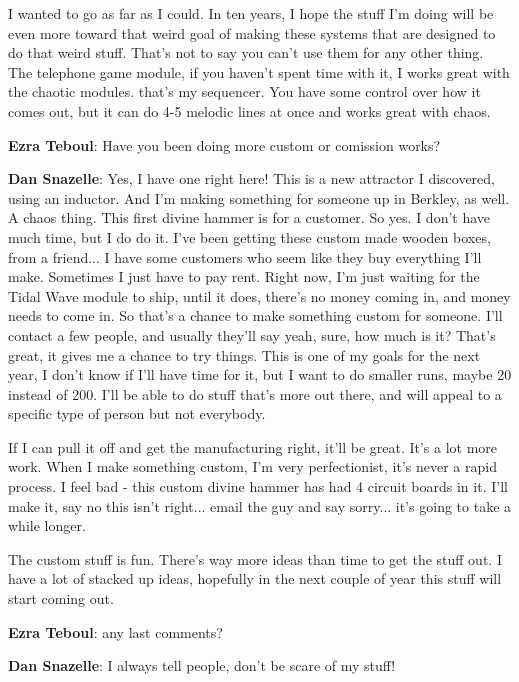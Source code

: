 I wanted to go as far as I could. In ten years, I hope the stuff I'm doing will be even more toward that weird goal of making these systems that are designed to do that weird stuff. That's not to say you can't use them for any other thing. The telephone game module, if you haven't spent time with it, I works great with the chaotic modules. that's my sequencer. You have some control over how it comes out, but it can do 4-5 melodic lines at once and works great with chaos. 

\textbf{Ezra Teboul}: Have you been doing more custom or comission works? 

\textbf{Dan Snazelle}: Yes, I have one right here! This is a new attractor I discovered, using an inductor. And I'm making something for someone up in Berkley, as well. A chaos thing. This first divine hammer is for a customer. So yes. I don't have much time, but I do do it. I've been getting these custom made wooden boxes, from a friend... I have some customers who seem like they buy everything I'll make. Sometimes I just have to pay rent. Right now, I'm just waiting for the Tidal Wave module to ship, until it does, there's no money coming in, and money needs to come in. So that's a chance to make something custom for someone. I'll contact a few people, and usually they'll say yeah, sure, how much is it? That's great, it gives me a chance to try things. This is one of my goals for the next year, I don't know if I'll have time for it, but I want to do smaller runs, maybe 20 instead of 200. I'll be able to do stuff that's more out there, and will appeal to a specific type of person but not everybody. 

If I can pull it off and get the manufacturing right, it'll be great. It's a lot more work. When I make something custom, I'm very perfectionist, it's never a rapid process. I feel bad - this custom divine hammer has had 4 circuit boards in it. I'll make it, say no this isn't right... email the guy and say sorry... it's going to take a while longer. 

The custom stuff is fun. There's way more ideas than time to get the stuff out. I have a lot of stacked up ideas, hopefully in the next couple of year this stuff will start coming out. 

\textbf{Ezra Teboul}: any last comments?

\textbf{Dan Snazelle}: I always tell people, don't be scare of my stuff! 

\newpage

\clearpage 

